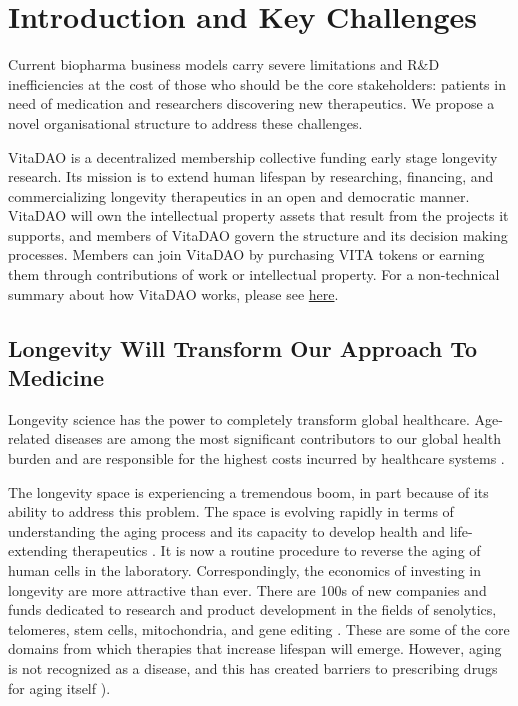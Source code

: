 \documentclass[12pt,letterpaper]{article}
\begin{document}
\newpage
\renewcommand{\contentsname}{\centering Table of Contents}

\tableofcontents

\newpage

\section{Introduction and Key Challenges}
Current biopharma business models carry severe limitations and R\&D inefficiencies at the cost of those who should be the core stakeholders: patients in need of medication and researchers discovering new therapeutics. We propose a novel organisational structure to address these challenges.
 
VitaDAO is a decentralized membership collective funding early stage longevity research. Its mission is to extend human lifespan by researching, financing, and commercializing longevity therapeutics in an open and democratic manner. VitaDAO will own the intellectual property assets that result from the projects it supports, and members of VitaDAO govern the structure and its decision making processes. Members can join VitaDAO by purchasing VITA tokens or earning them through contributions of work or intellectual property.
For a non-technical summary about how VitaDAO works, please see \href{https://vitadao.medium.com/how-vitadao-works-61bbf861fe96}{here}.

\subsection{Longevity Will Transform Our Approach To Medicine}
Longevity science has the power to completely transform global healthcare. Age-related diseases are among the most significant contributors to our global health burden and are responsible for the highest costs incurred by healthcare systems \citep{WHO2011}. 

The longevity space is experiencing a tremendous boom, in part because of its ability to address this problem. The space is evolving rapidly in terms of understanding the aging process and its capacity to develop health and life-extending therapeutics \citep{ARDD2020}. It is now a routine procedure to reverse the aging of human cells in the laboratory. Correspondingly, the economics of investing in longevity are more attractive than ever. There are 100s of new companies and funds dedicated to research and product development in the fields of senolytics, telomeres, stem cells, mitochondria, and gene editing \citep{Pfleger2021}. These are some of the core domains from which therapies that increase lifespan will emerge. However, aging is not recognized as a disease, and this has created barriers to prescribing drugs for aging itself \citep{Suresh2014}). 
\end{document}
